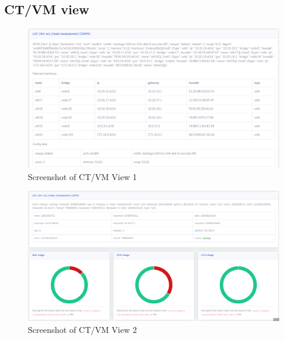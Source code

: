 \pagebreak

\subsection{CT/VM view}

\begin{figure}[!h]
  \centering
  \includegraphics[width=1.05\textwidth]{images/flask-application-2.png}
  \caption{Screenshot of CT/VM View 1}
  \label{CTView}
\end{figure}

\begin{figure}[!h]
  \centering
  \includegraphics[width=1.05\textwidth]{images/flask-application-3.png}
  \caption{Screenshot of CT/VM View 2}
  \label{CTView2}
\end{figure}

\pagebreak

